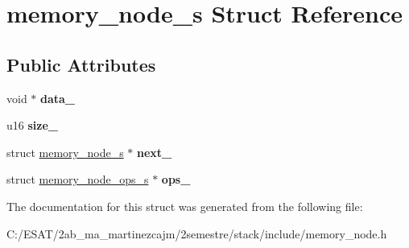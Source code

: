 \hypertarget{structmemory__node__s}{}\section{memory\+\_\+node\+\_\+s Struct Reference}
\label{structmemory__node__s}
\subsection*{Public Attributes}
\begin{DoxyCompactItemize}
\item 
\mbox{\label{structmemory__node__s_ae5c51b455c45732951edc8b5f9e205cf}} 
void $\ast$ {\bfseries data\+\_\+}
\item 
\mbox{\label{structmemory__node__s_aa8fbd1b47457157824d0e4bbb99f2721}} 
u16 {\bfseries size\+\_\+}
\item 
\mbox{\label{structmemory__node__s_a56e5430d28054fb5a0281bf3bc409acf}} 
struct \hyperlink{structmemory__node__s}{memory\+\_\+node\+\_\+s} $\ast$ {\bfseries next\+\_\+}
\item 
\mbox{\label{structmemory__node__s_a14e02a1ffddcb770d92d4a58658e35b9}} 
struct \hyperlink{structmemory__node__ops__s}{memory\+\_\+node\+\_\+ops\+\_\+s} $\ast$ {\bfseries ops\+\_\+}
\end{DoxyCompactItemize}


The documentation for this struct was generated from the following file\+:\begin{DoxyCompactItemize}
\item 
C\+:/\+E\+S\+A\+T/2ab\+\_\+ma\+\_\+martinezcajm/2semestre/stack/include/memory\+\_\+node.\+h\end{DoxyCompactItemize}
